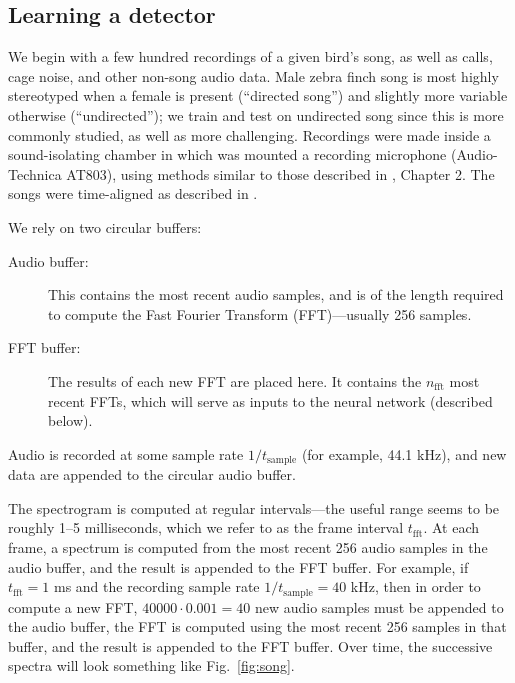 \documentclass[10pt,letterpaper]{article}
\newcommand\fig[1]{Fig.~\ref{#1}}
\begin{document}
\subsection{Learning a detector}

We begin with a few hundred recordings of a given bird's song, as well
as calls, cage noise, and other non-song audio data.  Male zebra finch
song is most highly stereotyped when a female is present (``directed
song'') and slightly more variable otherwise (``undirected''); we
train and test on undirected song since this is more commonly studied,
as well as more challenging.  Recordings were made inside a
sound-isolating chamber in which was mounted a recording microphone
(Audio-Technica AT803), using methods similar to those described in \cite{Tchernichovski2011SAP}, Chapter 2.  The songs were
time-aligned as described in \cite{Poole2012}.

We rely on two circular buffers:
\begin{description}
\item[Audio buffer:] This contains the most recent audio samples, and
  is of the length required to compute the Fast Fourier Transform
  (FFT)---usually 256 samples.
\item[FFT buffer:] The results of each new FFT are placed here.  It
  contains the $n_\textrm{fft}$ most recent FFTs, which will serve as
  inputs to the neural network (described below).
\end{description}

Audio is recorded at some sample rate $1/t_\mathrm{sample}$ (for example, 44.1 kHz), and new data are appended to the circular audio buffer.

The spectrogram is computed at regular intervals---the useful range
seems to be roughly 1--5 milliseconds, which we refer to as the frame
interval $t_\textrm{fft}$.  At each frame, a spectrum is computed from
the most recent 256 audio samples in the audio buffer, and the result
is appended to the FFT buffer.  For example, if $t_\textrm{fft}=1$ ms
and the recording sample rate $1/t_\textrm{sample}=40$ kHz, then in
order to compute a new FFT, $40000\cdot 0.001=40$ new audio samples
must be appended to the audio buffer, the FFT is computed using the
most recent 256 samples in that buffer, and the result is appended to
the FFT buffer.  Over time, the successive spectra will look something
like \fig{fig:song}.
\end{document}
